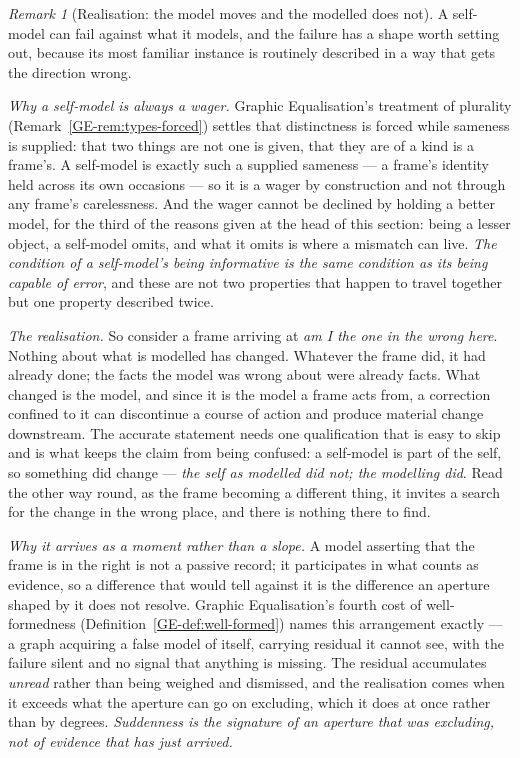 \documentclass[11pt,a4paper]{article}
\theoremstyle{remark}\newtheorem{remark}[definition]{Remark}
\begin{document}
\begin{remark}[Realisation: the model moves and the modelled does not]\label{rem:realisation}
A self-model can fail against what it models, and the failure has a shape worth setting out, because
its most familiar instance is routinely described in a way that gets the direction wrong.

\emph{Why a self-model is always a wager.} Graphic Equalisation's treatment of plurality
(Remark~\ref{GE-rem:types-forced}) settles that
distinctness is forced while sameness is supplied: that two things are not one is given, that they are
of a kind is a frame's. A self-model is exactly such a supplied sameness --- a frame's identity held
across its own occasions --- so it is a wager by construction and not through any frame's carelessness.
And the wager cannot be declined by holding a better model, for the third of the reasons given at the
head of this section: being a lesser object, a self-model omits, and what it omits is where a mismatch
can live. \emph{The condition of
a self-model's being informative is the same condition as its being capable of error}, and these are
not two properties that happen to travel together but one property described twice.

\emph{The realisation.} So consider a frame arriving at \emph{am I the one in the wrong here}. Nothing
about what is modelled has changed. Whatever the frame did, it had already done; the facts the model
was wrong about were already facts. What changed is the model, and since it is the model a frame acts
from, a correction confined to it can discontinue a course of action and produce material change
downstream. The accurate statement needs one qualification that is easy to skip and is what keeps the
claim from being confused: a self-model is part of the self, so something did change --- \emph{the self
as modelled did not; the modelling did}. Read the other way round, as the frame becoming a different
thing, it invites a search for the change in the wrong place, and there is nothing there to find.

\emph{Why it arrives as a moment rather than a slope.} A model asserting that the frame is in the right
is not a passive record; it participates in what counts as evidence, so a difference that would tell
against it is the difference an aperture shaped by it does not resolve. Graphic Equalisation's fourth
cost of well-formedness (Definition~\ref{GE-def:well-formed}) names this arrangement exactly --- a graph acquiring a false model of itself,
carrying residual it cannot see, with the failure silent and no signal that anything is missing. The
residual accumulates \emph{unread} rather than being weighed and dismissed, and the realisation comes
when it exceeds what the aperture can go on excluding, which it does at once rather than by degrees.
\emph{Suddenness is the signature of an aperture that was excluding, not of evidence that has just
arrived.}


\end{remark}
\end{document}
